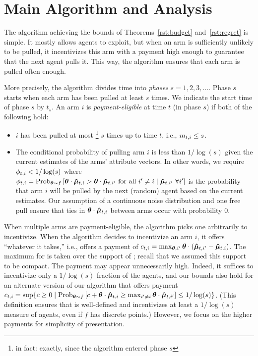 \section{Main Algorithm and Analysis}
\label{sec:ub}
The algorithm achieving the bounds of
Theorems~\ref{rst:budget} and~\ref{rst:regret} is simple.
It mostly allows agents to exploit, but when an arm is sufficiently
unlikely to be pulled,
it incentivizes this arm with a payment high enough
to guarantee that the next agent pulls it.
This way, the algorithm ensures that each arm is pulled often enough.

More precisely, the algorithm divides time into \emph{phases}
$s = 1, 2, 3, \ldots$.
Phase $s$ starts when each arm has been pulled at least $s$ times.
We indicate the start time of phase $s$ by $t_s$. An arm $i$ is \emph{payment-eligible} at time $t$ (in phase $s$)
if both of the following hold:

\begin{itemize}
\item $i$ has been pulled at most%
\footnote{in fact: exactly, since the algorithm entered phase $s$}
$s$ times up to time $t$, i.e., $m_{t,i} \leq s$.
\item 
The conditional probability of pulling arm $i$ is less than
$1/\log(s)$ given the current estimates  of the arms'
attribute vectors.  In other words, we require
$\phi_{t,i} < 1/\log(s)$ where 
$\PullProb{t}{i} = \Prob[\AgV \sim \AgentDist]{\AgV \cdot \ArmEV{t}{i} > \AgV
\cdot \ArmEV{t}{i'} \mbox{ for all } i' \neq i \mid \ArmEV{t}{i'}\ \forall i'}$
is the probability that arm $i$ will be pulled
by the next (random) agent based on the current estimates. 
Our assumption of a continuous noise distribution and one free pull
ensure that ties in $\bm{\theta} \cdot \bm{\hat{\mu}}_{t,i}$ between arms occur with
probability $0$.
\end{itemize}


When multiple arms are payment-eligible, the algorithm picks one arbitrarily to incentivize.
When the algorithm decides to incentivize an arm $i$,
it offers ``whatever it takes,'' i.e., offers a payment of
$c_{t,i} = \max_{\bm{\theta},i'} \bm{\theta} \cdot (\bm{\hat{\mu}}_{t,i'} - \bm{\hat{\mu}}_{t,i})$.
The maximum for \AgV is taken over the support of \AgentDist;
recall that we assumed this support to be compact.
The payment  may appear unnecessarily high.
Indeed, it suffices to
incentivize only a $1/\log(s)$ fraction of the agents,
and our bounds also hold for an alternate version of our algorithm that 
offers payment
$\Pay{t}{i} = \sup \Set{c \geq 0}{%
\Prob[\AgV \sim \AgentDist]{c + \AgV \cdot \ArmEV{t}{i} \geq \max_{i'\ne i} \AgV \cdot \ArmEV{t}{i'}} \leq 1/\log(s)}$.
(This definition ensures that  is well-defined
and incentivizes at least a $1/\log(s)$ measure of agents,
even if $f$ has discrete points.)
However, we focus on the higher payments for simplicity of presentation.

